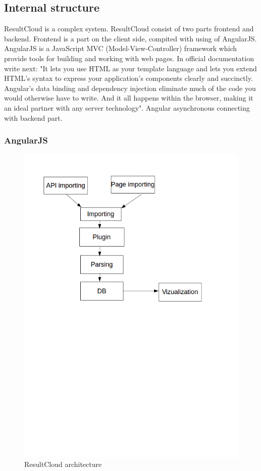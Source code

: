 \subsection{Internal structure}

ResultCloud is a complex system. ResultCloud consist of two parts frontend and backend. Frontend is a part on the client side, compited with using of AngularJS. AngularJS is a JavaScript MVC (Model-View-Controller) framework which provide tools for building and working with web pages. In official documentation write next: "It lets you use HTML as your template language and lets you extend HTML's syntax to express your application's components clearly and succinctly. Angular's data binding and dependency injection eliminate much of the code you would otherwise have to write. And it all happens within the browser, making it an ideal partner with any server technology"\cite{angularJS}. Angular asynchronous connecting with backend part. 

\subsubsection{AngularJS}

\begin{figure}
  \centering
    \includegraphics[trim=0 13.41cm 0 0,scale=0.5]{fig/result-cloud.png}
  \caption{ResultCloud architecture}
  \label{fig:result_cloud}
\end{figure}

